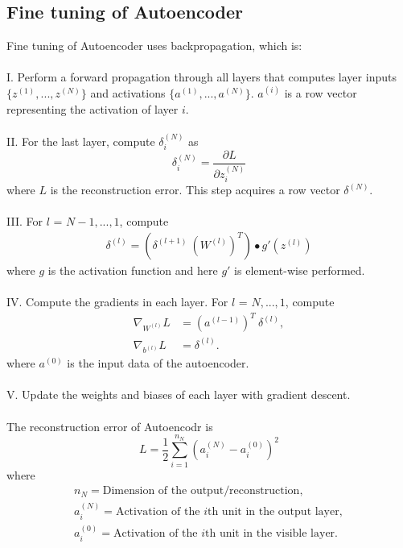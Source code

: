 \documentclass[12pt]{article}
\begin{document}
\subsection{Fine tuning of Autoencoder}
Fine tuning of Autoencoder uses backpropagation, which is:\\
\\
I. Perform a forward propagation through all layers that computes layer inputs $\{z^{(1)},..., z^{(N)}\}$ and activations $\{a^{(1)},..., a^{(N)}\}$. $a^{(i)}$ is a row vector representing the activation of layer $i$. \\
\\
II. For the last layer, compute $\delta_i^{(N)}$ as
\begin{equation}
\delta_i^{(N)} = \frac{\partial L}{\partial z^{(N)}_i}
\end{equation}
where $L$ is the reconstruction error. This step acquires a row vector $\delta^{(N)}$. \\
\\
III. For $l$ = $N-1, ..., 1$, compute 
\begin{align}
\delta^{(l)} = \left(\delta^{(l+1)} ~ (W^{(l)})^T \right) \bullet g'(z^{(l)})
\end{align}
where $g$ is the activation function and here $g'$ is element-wise performed.\\
\\
IV. Compute the gradients in each layer. For $l$ = $N, ..., 1$, compute 
\begin{align}
\nabla_{W^{(l)}} L &= (a^{(l-1)})^T~\delta^{(l)}, \\
\nabla_{b^{(l)}} L &= \delta^{(l)}.
\end{align}
where $a^{(0)}$ is the input data of the autoencoder.\\
\\
V. Update the weights and biases of each layer with gradient descent.\\
\\
The reconstruction error of Autoencodr is \begin{equation}
L = \frac{1}{2}\sum_{i=1}^{n_N}(a^{(N)}_i - a^{(0)}_i)^2
\end{equation}
where \begin{gather*}
n_{N} = \text{Dimension of the output/reconstruction},\\
a^{(N)}_{i} = \text{Activation of the }i\text{th unit in the output layer},\\
a^{(0)}_{i} = \text{Activation of the }i\text{th unit in the visible layer}.
\end{gather*}
\end{document}
